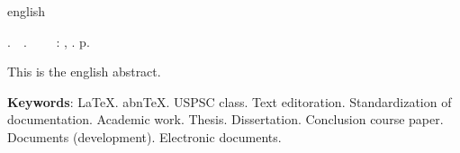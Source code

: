 \begin{resumo}[Abstract]
 \begin{otherlanguage*}{english}
   \begin{flushleft} 
   	\setlength{\absparsep}{0pt} %
   	\SingleSpacing 
   	\imprimirautorabr.~~\textbf{\imprimirtitleabstract}.~~\imprimirorientador~~	
   	\imprimirlocal: \imprimirinstituicao, \imprimirdata. \pageref{LastPage} p. 
   \end{flushleft}
	\OnehalfSpacing 
   This is the english abstract.

   \vspace{\onelineskip}
 
   \noindent 
   \textbf{Keywords}: LaTeX. abnTeX. USPSC class. Text editoration. Standardization of documentation. Academic work. Thesis. Dissertation. Conclusion course paper. Documents (development). Electronic documents.
   \end{otherlanguage*}
\end{resumo}
